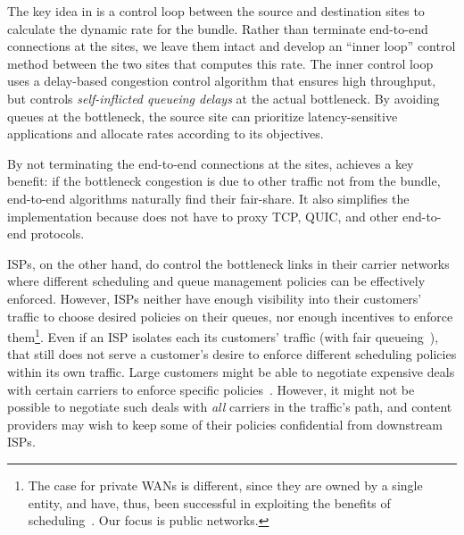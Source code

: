 The key idea in \name is a control loop between the source and destination sites to calculate the dynamic rate for the bundle. Rather than terminate end-to-end connections at the sites, we leave them intact and develop an ``inner loop'' control method between the two sites that computes this rate. The inner control loop uses a delay-based congestion control algorithm that ensures high throughput, but controls {\em self-inflicted queueing delays} at the actual bottleneck. By avoiding queues at the bottleneck, the source site can prioritize latency-sensitive applications and allocate rates according to its objectives.

By not terminating the end-to-end connections at the sites, \name{} achieves a key benefit: if the bottleneck congestion is due to other traffic not from the bundle, end-to-end algorithms naturally find their fair-share. It also simplifies the implementation because \name{} does not have to proxy TCP, QUIC, and other end-to-end protocols.






ISPs, on the other hand, do control the bottleneck links in their carrier networks where different scheduling and queue management policies can be effectively enforced. 
However, ISPs neither have enough visibility into their customers' traffic to choose desired policies on their queues, nor enough incentives to enforce them\footnote{The case for private WANs is different, since they are owned by a single entity, and have, thus, been successful in exploiting the benefits of scheduling~\cite{swan, b4, bwe}. Our focus is public networks.}. Even if an ISP isolates each its customers' traffic (\eg with fair queueing~\cite{fair-queueing}), that still does not serve a customer's desire to enforce different scheduling policies within its own traffic.  
Large customers might be able to negotiate expensive deals with certain carriers to enforce specific policies~\cite{att-qos}. 
However, it might not be possible to negotiate such deals with \emph{all} carriers in the traffic's path, and content providers may wish to keep some of their policies confidential from downstream ISPs. 

